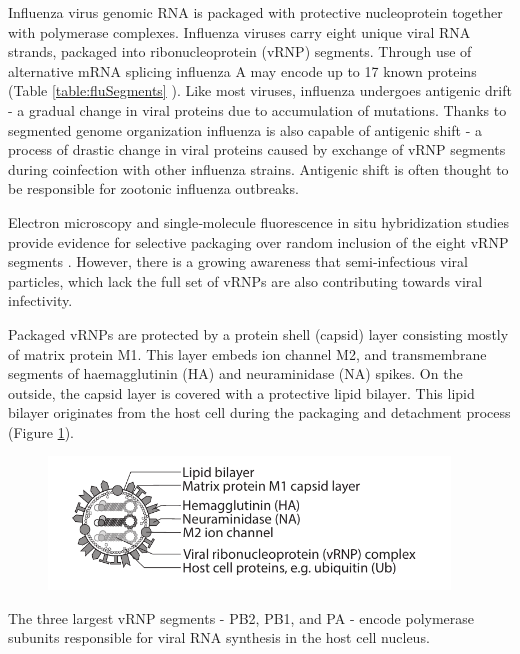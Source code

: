 Influenza virus genomic RNA is packaged with protective nucleoprotein together with polymerase complexes. Influenza viruses carry eight unique viral RNA strands, packaged into ribonucleoprotein  (vRNP) segments. Through use of alternative mRNA splicing influenza A may encode up to 17 known proteins (Table \ref{table:fluSegments} \cite{das2010structures, dubois2014influenza}). Like most viruses, influenza undergoes antigenic drift - a gradual change in viral proteins due to accumulation of mutations. Thanks to segmented genome organization influenza is also capable of antigenic shift - a process of drastic change in viral proteins caused by exchange of vRNP segments during coinfection with other influenza strains. Antigenic shift is often thought to be responsible for zootonic influenza outbreaks.

Electron microscopy and single‑molecule fluorescence in situ hybridization studies provide evidence for selective packaging over random inclusion of the eight vRNP segments \cite{eisfeld2015centre}. However, there is a growing awareness that semi-infectious viral particles, which lack the full set of vRNPs are also contributing towards viral infectivity.

Packaged vRNPs are protected by a protein shell (capsid) layer consisting mostly of matrix protein M1. This layer embeds ion channel M2, and transmembrane segments of haemagglutinin (HA) and neuraminidase (NA) spikes. On the outside, the capsid layer is covered with a protective lipid bilayer. This lipid bilayer originates from the host cell during the packaging and detachment process (Figure \ref{figure:fluStructure}).

\begin{figure}
\begin{center}
\includegraphics[width=0.95\textwidth, trim={0cm 0cm 0cm 0cm}, clip]{D_chapters/0_introduction/flu_structure.pdf}
\label{figure:fluStructure}
\end{center}
\end{figure}

The three largest vRNP segments - PB2, PB1, and PA - encode polymerase subunits responsible for viral RNA synthesis in the host cell nucleus.


